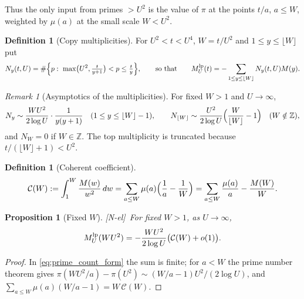\documentclass[11pt,reqno]{amsart}
\numberwithin{equation}{section}
\theoremstyle{plain}
\newtheorem{proposition}[theorem]{Proposition}
\theoremstyle{definition}
\newtheorem{definition}[theorem]{Definition}
\theoremstyle{remark}
\newtheorem{remark}[theorem]{Remark}
\newcommand{\Cc}{\mathcal{C}}
\newcommand{\tagNE}{\textup{[N-el]}}
\begin{document}
Thus the only input from primes $>U^2$ is the value of $\pi$ at the points
$t/a$, $a\le W$, weighted by $\mu(a)$ at the small scale $W<U^2$.

\begin{definition}[Copy multiplicities]
\label{def:copy-multiplicity}
For $U^2<t<U^4$, $W=t/U^2$ and $1\le y\le\lfloor W\rfloor$ put
\begin{equation}
\label{eq:Ny-exact}
  N_y(t,U)=\#\Bigl\{p:\ \max\bigl(U^2,\tfrac{t}{y+1}\bigr)<p\le\tfrac ty\Bigr\},
  \qquad\text{so that}\qquad
  M^{\rm lp}_U(t)=-\sum_{1\le y\le\lfloor W\rfloor}N_y(t,U)M(y).
\end{equation}
\end{definition}

\begin{remark}[Asymptotics of the multiplicities]
\label{rem:copy-count-asymptotic}
For fixed $W>1$ and $U\to\infty$,
\begin{equation}
\label{eq:Ny-fixed-W}
  N_y\sim\frac{WU^2}{2\log U}\cdot\frac1{y(y+1)}\quad(1\le y\le\lfloor W\rfloor-1),
  \qquad
  N_{\lfloor W\rfloor}\sim\frac{U^2}{2\log U}\Bigl(\frac W{\lfloor W\rfloor}-1\Bigr)
  \quad(W\notin\mathbb{Z}),
\end{equation}
and $N_W=0$ if $W\in\mathbb{Z}$. The top multiplicity is truncated because
$t/(\lfloor W\rfloor+1)<U^2$.
\end{remark}

\begin{definition}[Coherent coefficient]
\label{def:coherent_coefficient}
\begin{equation}
\label{eq:C_def}
  \Cc(W):=\int_1^W\frac{M(w)}{w^2}\,dw
  =\sum_{a\le W}\mu(a)\Bigl(\frac1a-\frac1W\Bigr)
  =\sum_{a\le W}\frac{\mu(a)}a-\frac{M(W)}W .
\end{equation}
\end{definition}

\begin{proposition}[Fixed $W$]
\label{prop:fixed-scale}
\tagNE\ For fixed $W>1$, as $U\to\infty$,
\begin{equation}
\label{eq:E_fixed_W}
  M^{\rm lp}_U(WU^2)=-\frac{WU^2}{2\log U}\bigl(\Cc(W)+o(1)\bigr).
\end{equation}
\end{proposition}

\begin{proof}
In \eqref{eq:prime_count_form} the sum is finite; for $a<W$ the prime number
theorem gives $\pi(WU^2/a)-\pi(U^2)\sim(W/a-1)U^2/(2\log U)$, and
$\sum_{a\le W}\mu(a)(W/a-1)=W\,\Cc(W)$.
\end{proof}
\end{document}
